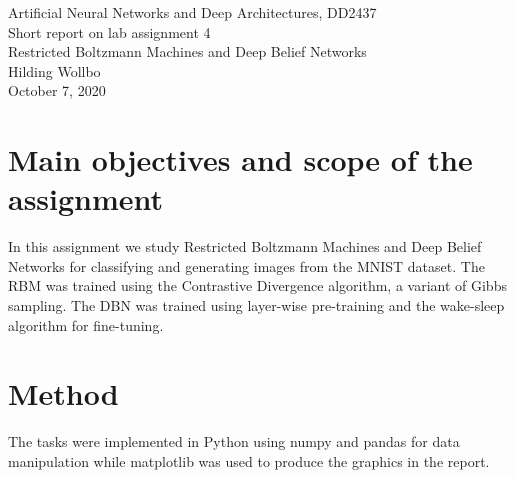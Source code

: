 \documentclass[a4paper]{article}
\begin{document}
\begin{center}
  {\large Artificial Neural Networks and Deep Architectures, DD2437}\\
  \vspace{7mm}
  {\huge Short report on lab assignment 4\\[1ex]}
  {\Large Restricted Boltzmann Machines and Deep Belief Networks}\\
  \vspace{8mm}  
  {\Large Hilding Wollbo\\}
  \vspace{4mm}
  {\large October 7, 2020\\}
\end{center}


\section{Main objectives and scope of the assignment}
In this assignment we study Restricted Boltzmann Machines and Deep Belief Networks for classifying and generating images from the MNIST dataset. The RBM was trained using the Contrastive Divergence algorithm, a variant of Gibbs sampling. The DBN was trained using layer-wise pre-training and the wake-sleep algorithm for fine-tuning.
\section{Method}
The tasks were implemented in Python using numpy and pandas for data manipulation while matplotlib was used to produce the graphics in the report.
\end{document}
